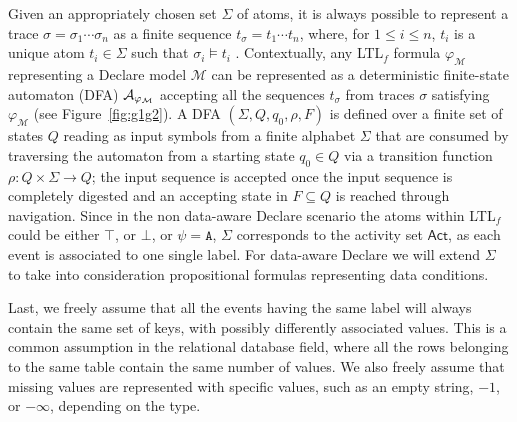 

Given an appropriately chosen set $\Sigma$ of atoms, it is always possible to represent a trace $\sigma=\sigma_1\cdots \sigma_n$ as a finite sequence $t_\sigma=t_1\cdots t_n$, where, for $1\leq i\leq n$, $t_i$ is a unique atom $t_i\in\Sigma$ such that $\sigma_i\vDash t_i$ \cite{XuLZ17a}.
Contextually,  any LTL$_f$ formula $\varphi_{\mathcal{M}}$ representing a Declare model $\mathcal{M}$ can be represented as a deterministic finite-state automaton (DFA) $\mathcal{A}_{\varphi_{\tiny\mathcal{M}}}$ \cite{Westergaard11} accepting all the sequences $t_\sigma$ from traces $\sigma$ satisfying $\varphi_{\mathcal{M}}$ (see Figure~\ref{fig:g1g2}). A DFA  $(\Sigma,Q,q_0,\rho,F)$ is defined \cite{0016921} over a finite set of states $Q$ reading as input symbols from a finite alphabet $\Sigma$ that are consumed by traversing the automaton from a starting state $q_0\in Q$ via a transition function $\rho\colon Q\times \Sigma\to Q$; the input sequence is accepted once the input sequence is completely digested and an accepting state in $F\subseteq Q$ is reached through navigation. Since in the non data-aware Declare scenario the atoms within LTL$_f$ could be either $\top$, or $\bot$, or $\psi=\texttt{A}$, $\Sigma$ corresponds to the activity set  $\textsf{Act}$, as each event is associated to one single label. For data-aware Declare we will extend $\Sigma$ to take into consideration propositional formulas representing data conditions.

Last, we freely assume that all the events having the same label will always contain the same set of keys, with possibly differently associated values. This is a common assumption in the relational database field, where all the rows belonging to the same table contain the same number of values. We also freely assume that missing values are represented with specific values, such as an empty string, $-1$, or $-\infty$, depending on the type. 